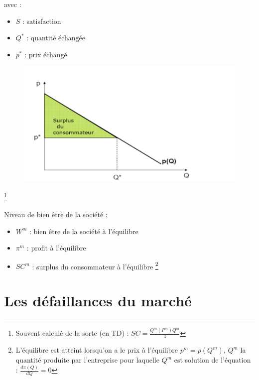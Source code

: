 avec :
\begin{itemize}
    \item $S$ : satisfaction
    \item $Q^{*}$ : quantité échangée
    \item $p^{*}$ : prix échangé
\end{itemize}
\begin{figure}[hbt!]
    \centering
    \includegraphics[scale=0.8]{Pics/surplus_consommateur.png}
\end{figure}
\begin{center}
    \Large{} \footnote{Souvent calculé de la sorte (en TD) : $SC = \frac{Q^{m}(P^{m})Q^{m}}{4} $}
\end{center}
Niveau de bien être de la société : 
\begin{center}
    \Large{}
\end{center}
\begin{itemize}
    \item $W^{m}$ : bien être de la société à l'équilibre
    \item $\pi^{m}$ : profit à l'équilibre
    \item $SC^{m}$ : surplus du consommateur à l'équilibre \footnote{L'équilibre est atteint lorsqu'on a le prix à l'équilibre $p^{m} = p(Q^{m})$, $Q^{m}$ la quantité produite par l'entreprise pour laquelle $Q^{m}$ est solution de l'équation : $\frac{d\pi(Q)}{dQ} = 0$}
\end{itemize}
\newpage
\section{Les défaillances du marché}
